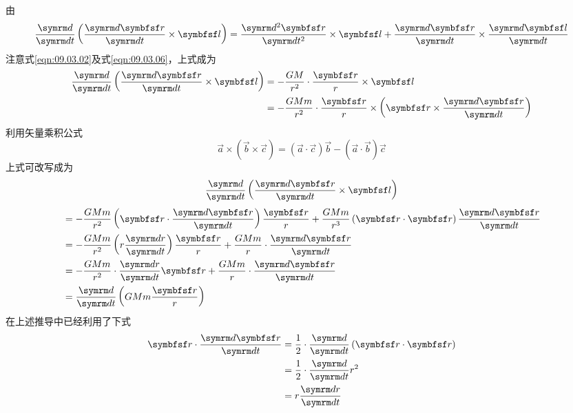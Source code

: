 由
\begin{equation*}
  \frac { \dif } { \dif t } \left( \frac { \dif \vec{r} } { \dif t } \times \vec{l} \right) = \frac { \dif ^ { 2 } \vec{r} } { \dif t ^ { 2 } } \times \vec{l} + \frac { \dif \vec{r} } { \dif t } \times \frac { \dif \vec{l}} { \dif t }
\end{equation*}
注意式\eqref{eqn:09.03.02}及式\eqref{eqn:09.03.06}，上式成为
\begin{equation*}
  \begin{split}
    \frac { \dif } { \dif t } \left( \frac { \dif \vec{r} } { \dif t } \times \vec{l} \right) &= - \frac { G M } { r ^ { 2 } } \cdot \frac { \vec{r} } { r } \times \vec{l} \\
    &= - \frac { G M m } { r ^ { 2 } } \cdot \frac { \vec{r} } { r } \times \left( \vec{r} \times \frac { \dif \vec{r} } { \dif t } \right)
  \end{split}
\end{equation*}
利用矢量乘积公式
\begin{equation}\label{eqn:09.03.08}
  \vec{a} \times \left( \vec{b} \times \vec{c} \right) = \left( \vec{a} \cdot \vec{c} \right) \vec{b} - \left( \vec{a} \cdot \vec{b} \right) \vec{c}
\end{equation}
上式可改写成为
\begin{equation*}
  \frac { \dif } { \dif t } \left( \frac { \dif \vec{r} } { \dif t } \times \vec{l} \right)
\end{equation*}
\begin{equation}\label{eqn:09.03.09}
  \begin{split}
    &= - \frac { G M m } { r ^ { 2 } } \left( \vec{r} \cdot \frac { \dif \vec{r} } { \dif t } \right) \frac { \vec{r} } { r } + \frac { G M m } { r ^ { 3 } } \left( \vec{r} \cdot \vec{r} \right) \frac { \dif \vec{r} } { \dif t } \\
    &= - \frac { G M m } { r ^ { 2 } } \left( r \frac { \dif r } { \dif t } \right) \frac { \vec{r} } { r } + \frac { G M m } { r } \cdot \frac { \dif \vec{r} } { \dif t } \\
    &= - \frac { G M m } { r ^ { 2 } } \cdot \frac { \dif r } { \dif t } \vec{r} + \frac { G M m } { r } \cdot \frac { \dif \vec{r} } { \dif t } \\
    &= \frac { \dif } { \dif t } \left( G M m \frac { \vec{r} } { r } \right)
  \end{split}
\end{equation}
在上述推导中已经利用了下式
\begin{equation*}
  \begin{split}
    \vec{r} \cdot \frac { \dif \vec{r} } { \dif t } &= \frac { 1 } { 2 } \cdot \frac { \dif } { \dif t } \left( \vec{r} \cdot \vec{r} \right) \\
    &= \frac { 1 } { 2 } \cdot \frac { \dif } { \dif t } r ^ { 2 } \\
    &= r \frac { \dif r } { \dif t }
  \end{split}
\end{equation*}
